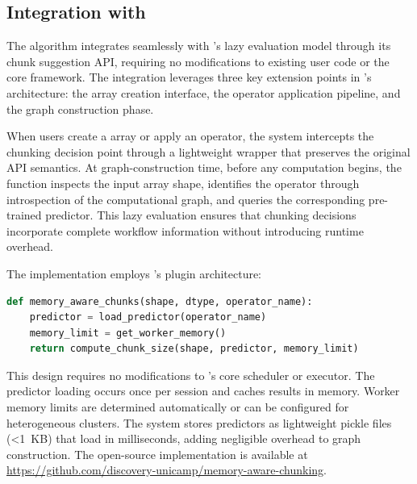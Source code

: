 \subsection{Integration with \dask}

The algorithm integrates seamlessly with \dask's lazy evaluation model through its chunk suggestion \ac{API}, requiring no modifications to existing user code or the core framework.
The integration leverages three key extension points in \dask's architecture: the array creation interface, the operator application pipeline, and the graph construction phase.

When users create a \dask array or apply an operator, the system intercepts the chunking decision point through a lightweight wrapper that preserves the original \ac{API} semantics.
At graph-construction time, before any computation begins, the function inspects the input array shape, identifies the operator through introspection of the computational graph, and queries the corresponding pre-trained predictor.
This lazy evaluation ensures that chunking decisions incorporate complete workflow information without introducing runtime overhead.

The implementation employs \dask's plugin architecture:
\begin{lstlisting}[language=Python]
def memory_aware_chunks(shape, dtype, operator_name):
    predictor = load_predictor(operator_name)
    memory_limit = get_worker_memory()
    return compute_chunk_size(shape, predictor, memory_limit)
\end{lstlisting}

This design requires no modifications to \dask's core scheduler or executor.
The predictor loading occurs once per session and caches results in memory.
Worker memory limits are determined automatically or can be configured for heterogeneous clusters.
The system stores predictors as lightweight pickle files (<1~KB) that load in milliseconds, adding negligible overhead to graph construction.
The open-source implementation is available at \url{https://github.com/discovery-unicamp/memory-aware-chunking}.

